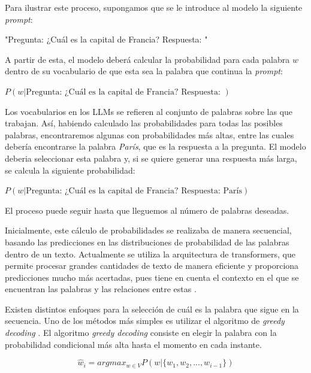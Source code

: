 \documentclass[11pt,spanish,listoffigures,listoftables]{tfgetsinf}
\begin{document}
Para ilustrar este proceso, supongamos que se le introduce al modelo la siguiente \textit{prompt}:

\begin{displayquote}
\centerline{"Pregunta: ¿Cuál es la capital de Francia? Respuesta: "}
\end{displayquote}

A partir de esta, el modelo deberá calcular la probabilidad para cada palabra $w$ dentro de su vocabulario de que esta sea la palabra que continua la \textit{prompt}:

\begin{displayquote}
\centerline{$P(w|\text{Pregunta: ¿Cuál es la capital de Francia? Respuesta: })$}
\end{displayquote}

Los vocabularios en los LLMs se refieren al conjunto de palabras sobre las que trabajan. Así, habiendo calculado las probabilidades para todas las posibles palabras, encontraremos algunas con probabilidades más altas, entre las cuales debería encontrarse la palabra \textit{París}, que es la respuesta a la pregunta. El modelo deberia seleccionar esta palabra y, si se quiere generar una respuesta más larga, se calcula la siguiente probabilidad:

\begin{displayquote}
\centerline{$P(w|\text{Pregunta: ¿Cuál es la capital de Francia? Respuesta: París})$}
\end{displayquote}

El proceso puede seguir hasta que lleguemos al número de palabras deseadas.

Inicialmente, este cálculo de probabilidades se realizaba de manera secuencial, basando las predicciones en las distribuciones de probabilidad de las palabras dentro de un texto. Actualmente se utiliza la arquitectura de transformers, que permite procesar grandes cantidades de texto de manera eficiente y proporciona predicciones mucho más acertadas, pues tiene en cuenta el contexto en el que se encuentran las palabras y las relaciones entre estas \cite{burtsev2023working}.

Existen distintos enfoques para la selección de cuál es la palabra que sigue en la secuencia. Uno de los métodos más simples es utilizar el algoritmo de \textit{greedy decoding} \cite{gu2017trainablegreedydecodingneural}. El algoritmo \textit{greedy decoding} consiste en elegir la palabra con la probabilidad condicional más alta hasta el momento en cada instante.

\begin{equation}
\hat{w}_i = argmax_{w \in V} P(w | \{w_1, w_2, ..., w_{i-1}\})
\end{equation}
\end{document}
